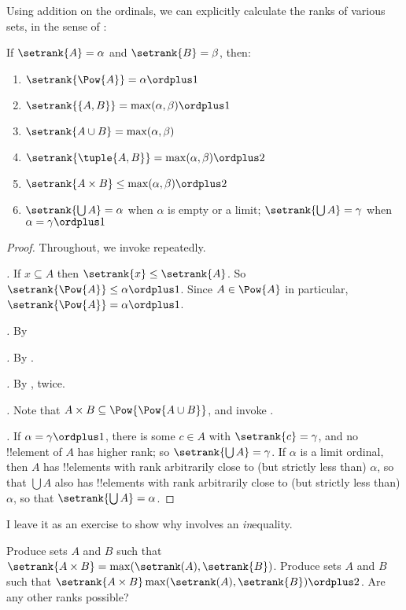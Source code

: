 \documentclass[../../../include/open-logic-section]{subfiles}
\begin{document}
Using addition on the ordinals, we can explicitly calculate the ranks of various sets, in the sense of :
\begin{lem}
	If $\setrank{A} = \alpha$ and $\setrank{B} = \beta$, then:
	\begin{enumerate}
		\item{} $\setrank{\Pow{A}} = \alpha\ordplus 1$
		\item{} $\setrank{\{A, B\}} = \max(\alpha, \beta) \ordplus  1$
		\item{} $\setrank{A \cup B} = \max(\alpha, \beta)$
		\item{} $\setrank{\tuple{A,B}} = \max(\alpha, \beta) \ordplus  2$
		\item{} $\setrank{A \times B} \leq \max(\alpha, \beta) \ordplus  2$
		\item{} $\setrank{\bigcup A} = \alpha$ when  $\alpha$ is empty or a limit; $\setrank{\bigcup A} = \gamma$ when $\alpha = \gamma\ordplus 1$
	\end{enumerate}
\end{lem}
\begin{proof}
	Throughout, we invoke  repeatedly.
	
	\emph{.} If $x \subseteq A$ then $\setrank{x} \leq \setrank{A}$. So $\setrank{\Pow{A}} \leq \alpha \ordplus  1$. Since $A \in \Pow{A}$ in particular, $\setrank{\Pow{A}} = \alpha \ordplus  1$.
	
	\emph{.} By 
		
	\emph{.} By .

	\emph{.} By , twice.
	
	\emph{.} Note that $A \times B \subseteq \Pow{\Pow{A \cup B}}$, and invoke . 
	
	\emph{.} If $\alpha = \gamma\ordplus 1$, there is some $c \in A$ with $\setrank{c} = \gamma$, and no !!{element} of $A$ has higher rank; so $\setrank{\bigcup A} = \gamma$. If $\alpha$ is a limit ordinal, then $A$ has !!{element}s with rank arbitrarily close to (but strictly less than) $\alpha$, so that $\bigcup A$ also has !!{element}s with rank arbitrarily close to (but strictly less than) $\alpha$, so that $\setrank{\bigcup A} = \alpha$.
\end{proof}\noindent
I leave it as an exercise to show why  involves an \emph{in}equality.
\begin{prob}
	Produce sets $A$ and $B$ such that $\setrank{A \times B}= \max(\setrank(A), \setrank{B})$. Produce sets $A$ and $B$ such that $\setrank{A \times B}\max(\setrank(A), \setrank{B}) \ordplus  2$. Are any other ranks possible?
\end{prob}
\end{document}
